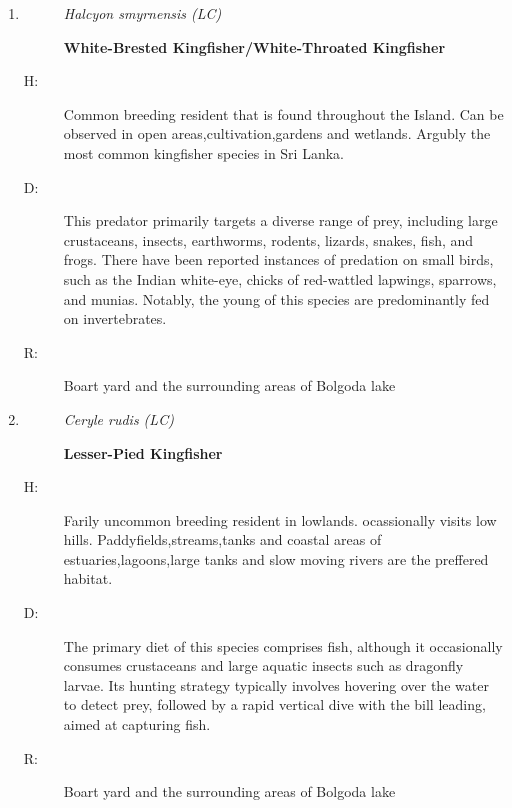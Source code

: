 \begin{itemize}
\begin{enumerate}
%
\item%
\begin{description}%
\item[]%
\textit{Halcyon smyrnensis (LC)}%
\item[]%
\textbf{White{-}Brested Kingfisher/White{-}Throated Kingfisher}%
\end{description}%
\begin{description}%
\item[H: ]%
Common breeding resident that is found throughout the Island. Can be observed in open areas,cultivation,gardens and wetlands. Argubly the most common kingfisher species in Sri Lanka.%
\item[D: ]%
This predator primarily targets a diverse range of prey, including large crustaceans, insects, earthworms, rodents, lizards, snakes, fish, and frogs. There have been reported instances of predation on small birds, such as the Indian white{-}eye, chicks of red{-}wattled lapwings, sparrows, and munias. Notably, the young of this species are predominantly fed on invertebrates.%
\item[R: ]%
Boart yard and the surrounding areas of Bolgoda lake%
\end{description}%
\item%
\begin{description}%
\item[]%
\textit{Ceryle rudis (LC)}%
\item[]%
\textbf{Lesser{-}Pied Kingfisher}%
\end{description}%
\begin{description}%
\item[H: ]%
Farily uncommon breeding resident in lowlands. ocassionally visits low hills. Paddyfields,streams,tanks and coastal areas of estuaries,lagoons,large tanks and slow moving rivers are the preffered habitat.%
\item[D: ]%
The primary diet of this species comprises fish, although it occasionally consumes crustaceans and large aquatic insects such as dragonfly larvae. Its hunting strategy typically involves hovering over the water to detect prey, followed by a rapid vertical dive with the bill leading, aimed at capturing fish.%
\item[R: ]%
Boart yard and the surrounding areas of Bolgoda lake%

\end{description}
\end{enumerate}
\end{itemize}
